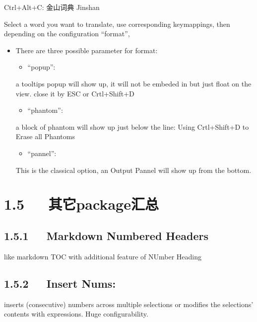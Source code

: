 \documentclass[letterpaper,12pt,english]{sphinxmanual}
\begin{document}
Ctrl+Alt+C: 金山词典 Jinshan

Select a word you want to translate, use corresponding key\sphinxhyphen{}mappings,
then depending on the configuration “format”,
\begin{itemize}
\item {} 
There are three possible parameter for format:
\begin{itemize}
\item {} 
“popup”:

\end{itemize}

a tooltips pop\sphinxhyphen{}up will show up, it will not be embeded in but just
float on the view. close it by ESC or Crtl+Shift+D
\begin{itemize}
\item {} 
“phantom”:

\end{itemize}

a block of phantom will show up just below the line: Using
Crtl+Shift+D to Erase all Phantoms
\begin{itemize}
\item {} 
“pannel”:

\end{itemize}

This is the classical option, an Output Pannel will show up from the
bottom.

\end{itemize}


\section{1.5   其它package汇总}
\label{\detokenize{001software/001install/sublime:package}}

\subsection{1.5.1   Markdown Numbered Headers}
\label{\detokenize{001software/001install/sublime:markdown-numbered-headers}}
like markdown TOC with additional feature of NUmber Heading


\subsection{1.5.2   Insert Nums:}
\label{\detokenize{001software/001install/sublime:insert-nums}}

inserts (consecutive) numbers across multiple selections or modifies the
selections’ contents with expressions. Huge configurability.
\end{document}
